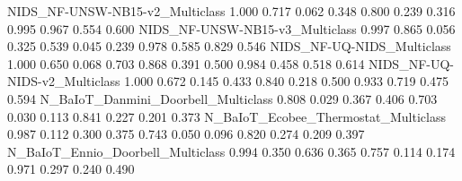 NIDS_NF-UNSW-NB15-v2_Multiclass                                            1.000            0.717                                    0.062                           0.348           0.800                    0.239                                                     0.316                                     0.995                                     0.967                              0.554   0.600
NIDS_NF-UNSW-NB15-v3_Multiclass                                            0.997            0.865                                    0.056                           0.325           0.539                    0.045                                                     0.239                                     0.978                                     0.585                              0.829   0.546
NIDS_NF-UQ-NIDS_Multiclass                                                 1.000            0.650                                    0.068                           0.703           0.868                    0.391                                                     0.500                                     0.984                                     0.458                              0.518   0.614
NIDS_NF-UQ-NIDS-v2_Multiclass                                              1.000            0.672                                    0.145                           0.433           0.840                    0.218                                                     0.500                                     0.933                                     0.719                              0.475   0.594
N_BaIoT_Danmini_Doorbell_Multiclass                                        0.808            0.029                                    0.367                           0.406           0.703                    0.030                                                     0.113                                     0.841                                     0.227                              0.201   0.373
N_BaIoT_Ecobee_Thermostat_Multiclass                                       0.987            0.112                                    0.300                           0.375           0.743                    0.050                                                     0.096                                     0.820                                     0.274                              0.209   0.397
N_BaIoT_Ennio_Doorbell_Multiclass                                          0.994            0.350                                    0.636                           0.365           0.757                    0.114                                                     0.174                                     0.971                                     0.297                              0.240   0.490
